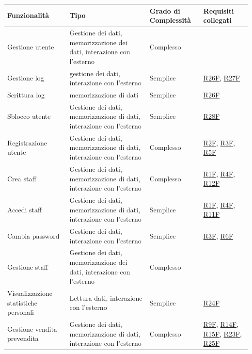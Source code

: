 \documentclass[a4paper]{article}
\begin{document}
\begin{center}
    \begin{tabularx}{1\textwidth}{|X|X|X|X|}
        \hline
        \textbf{Funzionalità} & \textbf{Tipo} & \textbf{Grado di Complessità} & \textbf{Requisiti collegati}\\
        \hline
        \hline
        Gestione utente & Gestione dei dati, memorizzazione dei dati, interazione con l'esterno & Complesso & \\
        \hline
        Gestione log & gestione dei dati, interazione con l'esterno & Semplice & \hyperlink{R26F}{R26F}, \hyperlink{R27F}{R27F}\\
        \hline
        Scrittura log & memorizzazione di dati & Semplice & \hyperlink{R26F}{R26F}\\
        \hline
        Sblocco utente & Gestione dei dati, memorizzazione di dati, interazione con l'esterno & Semplice & \hyperlink{R28F}{R28F}\\
        \hline
        Registrazione utente & Gestione dei dati, memorizzazione di dati, interazione con l'esterno & Complesso & \hyperlink{R2F}{R2F}, \hyperlink{R3F}{R3F}, \hyperlink{R5F}{R5F} \\
        \hline
        Crea staff & Gestione dei dati, memorizzazione di dati, interazione con l'esterno & Complesso & \hyperlink{R1F}{R1F}, \hyperlink{R4F}{R4F}, \hyperlink{R12F}{R12F}\\
        \hline
        Accedi staff & Gestione dei dati, memorizzazione di dati, interazione con l'esterno & Semplice & \hyperlink{R1F}{R1F}, \hyperlink{R4F}{R4F}, \hyperlink{R11F}{R11F} \\
        \hline
        Cambia password & Gestione dei dati, interazione con l'esterno & Semplice & \hyperlink{R3F}{R3F}, \hyperlink{R6F}{R6F} \\
        \hline
        Gestione staff & Gestione dei dati, memorizzazione dei dati, interazione con l'esterno & Complesso &  \\
        \hline
        Visualizzazione statistiche personali & Lettura dati, interazione con l'esterno & Semplice &  \hyperlink{R24F}{R24F} \\
        \hline
        Gestione vendita prevendita & Gestione dei dati, memorizzazione di dati, interazione con l'esterno & Complesso & \hyperlink{R9F}{R9F}, \hyperlink{R14F}{R14F}, \hyperlink{R15F}{R15F}, \hyperlink{R23F}{R23F}, \hyperlink{R25F}{R25F} \\

\end{tabularx}
\end{center}
\end{document}
